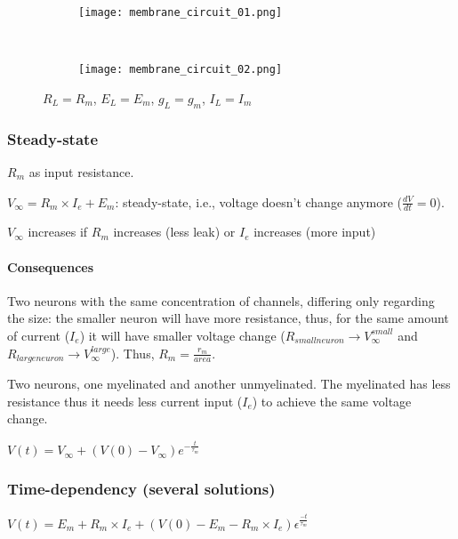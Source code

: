 \documentclass[main]{subfiles}
\begin{document}
\begin{figure}[H]
	\centering
	\begin{subfigure}[b]{0.3\textwidth}
		\centering
		\texttt{[image: membrane\_circuit\_01.png]}
	\end{subfigure}%
	~
	\begin{subfigure}[b]{0.5\textwidth}
		\centering
		\texttt{[image: membrane\_circuit\_02.png]}
	\end{subfigure}
	\caption{$R_L = R_m$, $E_L = E_m$, $g_L = g_m$, $I_L = I_m$}
\end{figure}

\subsubsection{Steady-state}
$R_m$ as input resistance.

$V_\infty = R_m \times I_e + E_m$: steady-state, i.e., voltage doesn't change anymore ($\frac{dV}{dt}=0$).

$V_\infty$ increases if $R_m$ increases (less leak) or $I_e$ increases (more input)

\paragraph{Consequences}
Two neurons with the same concentration of channels, differing only regarding the size: the smaller neuron will have more resistance, thus, for the same amount of current ($I_e$) it will have smaller voltage change ($R_{small neuron} \rightarrow V^{small}_\infty$ and $R_{large neuron} \rightarrow V^{large}_\infty$). Thus, $R_m = \frac{r_m}{area}$.

Two neurons, one myelinated and another unmyelinated. The myelinated has less resistance thus it needs less current input ($I_e$) to achieve the same voltage change.

$V(t) = V_\infty+(V(0)-V_\infty)e^{-\frac{t}{\tau_m}}$


\subsubsection{Time-dependency (several solutions)}
$V(t) = E_m + R_m \times I_e + (V(0) - E_m - R_m \times I_e) \epsilon^{\frac{-t}{\tau_m}}$


\end{document}
